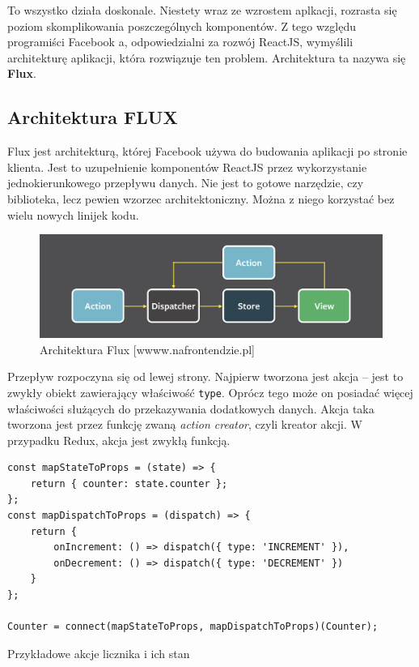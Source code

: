 To wszystko działa doskonale. Niestety wraz ze wzrostem aplkacji,
rozrasta się poziom skomplikowania poszczególnych komponentów.
Z tego względu programiści Facebook a, odpowiedzialni za rozwój ReactJS, wymyślili architekturę aplikacji, która rozwiązuje ten problem.
Architektura ta nazywa się \textbf{Flux}. ~\cite{www_nafrontendzie}

\subsection{Architektura FLUX}

Flux jest architekturą, której Facebook używa do budowania aplikacji po stronie klienta.
Jest to uzupełnienie komponentów ReactJS przez wykorzystanie jednokierunkowego przepływu danych.
Nie jest to gotowe narzędzie, czy biblioteka, lecz pewien wzorzec architektoniczny.
Można z niego korzystać bez wielu nowych linijek kodu.

\begin{figure}
	\centering\includegraphics[width=.6\textwidth]{img/flux.png}
	\caption{Architektura Flux [wwww.nafrontendzie.pl]}\label{rys:flux}%
\end{figure}

Przepływ rozpoczyna się od lewej strony.
Najpierw tworzona jest akcja – jest to zwykły obiekt zawierający właściwość \texttt{type}.
Oprócz tego może on posiadać więcej właściwości służących do przekazywania dodatkowych danych.
Akcja taka tworzona jest przez funkcję zwaną \textit{action creator}, czyli kreator akcji.
W przypadku Redux, akcja jest zwykłą funkcją.

\begin{listing}
\begin{verbatim}
const mapStateToProps = (state) => {
    return { counter: state.counter };
};
const mapDispatchToProps = (dispatch) => {
    return {
        onIncrement: () => dispatch({ type: 'INCREMENT' }),
        onDecrement: () => dispatch({ type: 'DECREMENT' })
    }
};

Counter = connect(mapStateToProps, mapDispatchToProps)(Counter);
\end{verbatim}
\caption{Przykładowe akcje licznika i ich stan} \label{listing:licznik}
\end{listing}

